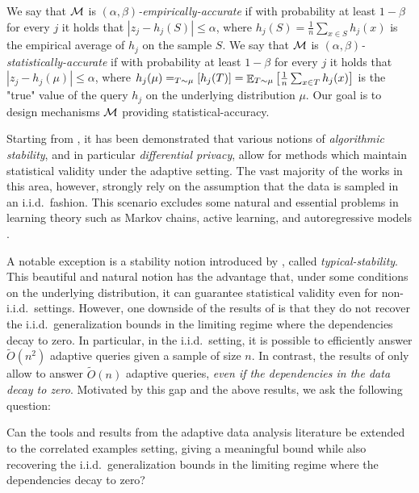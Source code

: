 \documentclass[12pt,a4paper,oneside,onecolumn]{book}
\begin{document}
We say that $\mathcal{M}$ is {\em $(\alpha,\beta)$-empirically-accurate} if with probability at least $1-\beta$ for every $j$ it holds that $|z_j-h_j(S)|\leq\alpha$, where $h_j(S)=\frac{1}{n}\sum_{x\in S}h_j(x)$ is the empirical average of $h_j$ on the sample $S$. We say that $\mathcal{M}$ is {\em $(\alpha,\beta)$-statistically-accurate} if with probability at least $1-\beta$ for every $j$ it holds that $|z_j-h_j(\mu)|\leq\alpha$, where $h_j(\mu)=
_{T\sim \mu}\left[h_j(T)\right]=\mathop{\mathbb{E}}_{T\sim \mu}\left[\frac{1}{n}\sum_{x\in T}h_j(x)\right]$ is the "true" value of the query $h_j$ on the underlying distribution $\mu$. Our goal is to design mechanisms $\mathcal{M}$ providing statistical-accuracy.

Starting from \cite{dwork2015reusable,dwork2015generalization}, it has been demonstrated that  
various
notions of {\em algorithmic stability},
and in particular 
{\em differential privacy},
allow for methods which maintain statistical validity under the adaptive setting.
The vast majority of the works in this area, however,  strongly rely on the assumption that the data is sampled in an i.i.d.\ fashion.
This scenario excludes some natural and essential problems in learning theory
such as Markov chains, active learning, and autoregressive models
\citep{kontram06, jap/1421763330,kontorovich2017concentration,settles2009active,hanneke2014theory,10.1162/00335530151144131}.

A notable exception is a stability notion introduced by \citet{DBLP:journals/corr/BassilyF16}, called {\em typical-stability}.
This beautiful and natural notion has the advantage that, under some conditions on the underlying distribution, it can guarantee statistical validity even for non-i.i.d.\ settings. However, one downside of the results of \citet{DBLP:journals/corr/BassilyF16} is that they do not recover the i.i.d.\ generalization bounds in the limiting regime where the dependencies decay to zero. In particular, in the i.i.d.\ setting, it is possible to efficiently answer $\tilde{O}(n^2)$ adaptive queries given a sample of size $n$. In contrast, the results of \citet{DBLP:journals/corr/BassilyF16} only allow to answer $\tilde{O}(n)$ adaptive queries, {\em even if the dependencies in the data decay to zero}. 
Motivated by this gap and the above results, we ask the following question:

\begin{question}
Can the tools and results from the  adaptive data analysis literature be extended to the correlated examples setting, 
giving a meaningful bound while also recovering the i.i.d.\ generalization bounds in the limiting regime where the dependencies decay to zero?
\end{question}
\end{document}
